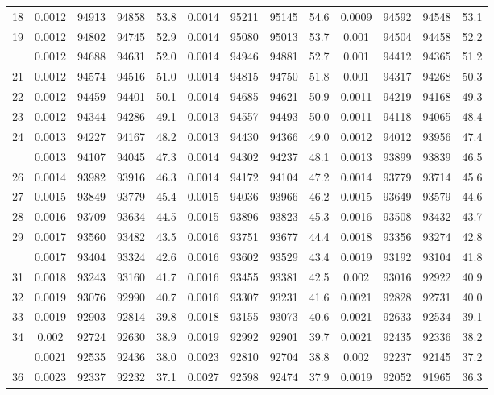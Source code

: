 \documentclass[
  14pt,
]{article}
\begin{document}
\begin{longtable}[t]{lcccccccccccc}
18 & 0.0012 & 94913 & 94858 & 53.8 & 0.0014 & 95211 & 95145 & 54.6 & 0.0009 & 94592 & 94548 & 53.1\\
19 & 0.0012 & 94802 & 94745 & 52.9 & 0.0014 & 95080 & 95013 & 53.7 & 0.001 & 94504 & 94458 & 52.2\\
\addlinespace
20 & 0.0012 & 94688 & 94631 & 52.0 & 0.0014 & 94946 & 94881 & 52.7 & 0.001 & 94412 & 94365 & 51.2\\
21 & 0.0012 & 94574 & 94516 & 51.0 & 0.0014 & 94815 & 94750 & 51.8 & 0.001 & 94317 & 94268 & 50.3\\
22 & 0.0012 & 94459 & 94401 & 50.1 & 0.0014 & 94685 & 94621 & 50.9 & 0.0011 & 94219 & 94168 & 49.3\\
23 & 0.0012 & 94344 & 94286 & 49.1 & 0.0013 & 94557 & 94493 & 50.0 & 0.0011 & 94118 & 94065 & 48.4\\
24 & 0.0013 & 94227 & 94167 & 48.2 & 0.0013 & 94430 & 94366 & 49.0 & 0.0012 & 94012 & 93956 & 47.4\\
\addlinespace
25 & 0.0013 & 94107 & 94045 & 47.3 & 0.0014 & 94302 & 94237 & 48.1 & 0.0013 & 93899 & 93839 & 46.5\\
26 & 0.0014 & 93982 & 93916 & 46.3 & 0.0014 & 94172 & 94104 & 47.2 & 0.0014 & 93779 & 93714 & 45.6\\
27 & 0.0015 & 93849 & 93779 & 45.4 & 0.0015 & 94036 & 93966 & 46.2 & 0.0015 & 93649 & 93579 & 44.6\\
28 & 0.0016 & 93709 & 93634 & 44.5 & 0.0015 & 93896 & 93823 & 45.3 & 0.0016 & 93508 & 93432 & 43.7\\
29 & 0.0017 & 93560 & 93482 & 43.5 & 0.0016 & 93751 & 93677 & 44.4 & 0.0018 & 93356 & 93274 & 42.8\\
\addlinespace
30 & 0.0017 & 93404 & 93324 & 42.6 & 0.0016 & 93602 & 93529 & 43.4 & 0.0019 & 93192 & 93104 & 41.8\\
31 & 0.0018 & 93243 & 93160 & 41.7 & 0.0016 & 93455 & 93381 & 42.5 & 0.002 & 93016 & 92922 & 40.9\\
32 & 0.0019 & 93076 & 92990 & 40.7 & 0.0016 & 93307 & 93231 & 41.6 & 0.0021 & 92828 & 92731 & 40.0\\
33 & 0.0019 & 92903 & 92814 & 39.8 & 0.0018 & 93155 & 93073 & 40.6 & 0.0021 & 92633 & 92534 & 39.1\\
34 & 0.002 & 92724 & 92630 & 38.9 & 0.0019 & 92992 & 92901 & 39.7 & 0.0021 & 92435 & 92336 & 38.2\\
\addlinespace
35 & 0.0021 & 92535 & 92436 & 38.0 & 0.0023 & 92810 & 92704 & 38.8 & 0.002 & 92237 & 92145 & 37.2\\
36 & 0.0023 & 92337 & 92232 & 37.1 & 0.0027 & 92598 & 92474 & 37.9 & 0.0019 & 92052 & 91965 & 36.3\\

\end{longtable}
\end{document}
